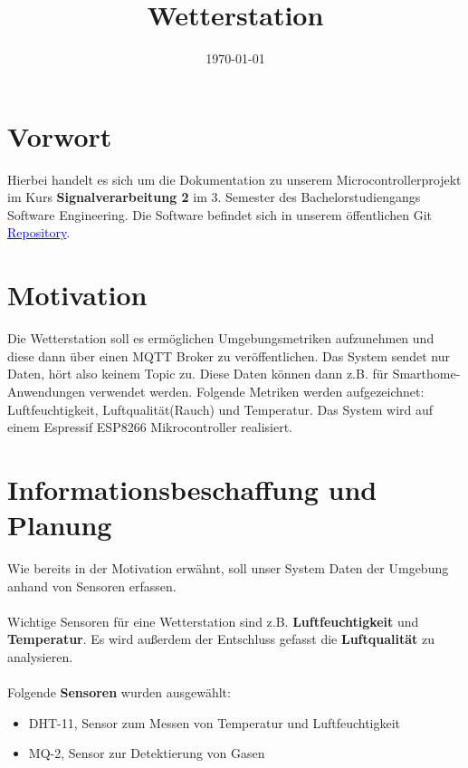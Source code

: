 \documentclass[a4paper, 11pt]{article}
\begin{document}

\title{Wetterstation}
\date{\today}
\maketitle

\section*{Vorwort}
Hierbei handelt es sich um die Dokumentation zu unserem Microcontrollerprojekt 
im Kurs \textbf{Signalverarbeitung 2} im 3. Semester des Bachelorstudiengangs
Software Engineering.
Die Software befindet sich in unserem öffentlichen Git 
\href{https://github.com/ckiri/wetterstation}{\textcolor{blue}{Repository}}.

\section*{Motivation}
Die Wetterstation soll es ermöglichen Umgebungsmetriken aufzunehmen
und diese dann über einen MQTT Broker zu veröffentlichen.
Das System sendet nur Daten, hört also keinem Topic zu.
Diese Daten können dann z.B. für Smarthome-Anwendungen verwendet
werden.
Folgende Metriken werden aufgezeichnet:
Luftfeuchtigkeit, Luftqualität(Rauch) und Temperatur.
Das System wird auf einem Espressif ESP8266 Mikrocontroller
realisiert.

\newpage

\tableofcontents
\listoffigures

\newpage
{}

\section{Informationsbeschaffung und Planung}
Wie bereits in der Motivation erwähnt, soll unser System Daten der Umgebung anhand
von Sensoren erfassen.\\
\\
Wichtige Sensoren für eine Wetterstation sind z.B. \textbf{Luftfeuchtigkeit} und
\textbf{Temperatur}. Es wird außerdem der Entschluss gefasst die
\textbf{Luftqualität} zu analysieren.\\
\\
Folgende \textbf{Sensoren} wurden ausgewählt:
\begin{itemize}
    \item DHT-11, Sensor zum Messen von Temperatur und Luftfeuchtigkeit
    \item MQ-2, Sensor zur Detektierung von Gasen
\end{itemize}
\end{document}
